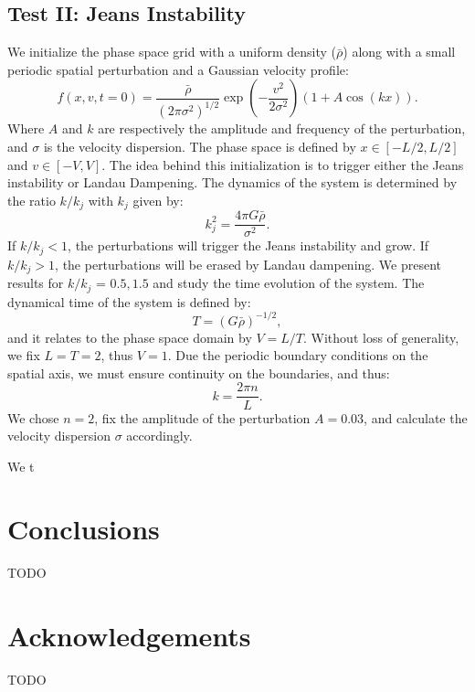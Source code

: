 \documentclass[fleqn,usenatbib]{mnras}
\begin{document}
\subsection{Test II: Jeans Instability}
We initialize the phase space grid with a uniform density ($\bar{\rho}$) along with a small periodic spatial perturbation and a Gaussian velocity profile:
\begin{equation}
f(x,v,t = 0) = \frac{\bar{\rho}}{(2\pi \sigma^2)^{1/2}} \exp(-\frac{v^2}{2 \sigma^2}) (1 + A\cos(kx)).
\end{equation} 
Where $A$ and $k$ are respectively the amplitude and frequency of the perturbation, and $\sigma$ is the velocity dispersion.
The phase space is defined by $x \in [-L/2,L/2]$ and $v \in [-V,V]$. The idea behind this initialization is to trigger either the Jeans instability or Landau Dampening. The dynamics of the system is determined by the ratio $k/k_j$ with $k_j$ given by:
\begin{equation}
\label{eq: k_j}
k_j^2 = \frac{4 \pi G \bar{\rho}}{\sigma^2}.
\end{equation}
If $k/k_j < 1$, the perturbations will trigger the Jeans instability and grow.
If $k/k_j>1$, the perturbations will be erased by Landau dampening.
We present results for $k/k_j$ = $0.5,1.5$ and study the time evolution of the system. The dynamical time of the system is defined by:
\begin{equation}
T = (G \bar{\rho})^{-1/2},
\end{equation}
and it relates to the phase space domain by $V = L / T$. Without loss of generality, we fix $L = T = 2$, thus $V = 1$.
Due the periodic boundary conditions on the spatial axis, we must ensure continuity on the boundaries, and thus:
\begin{equation}
k = \frac{2 \pi n}{L}.
\end{equation}
We chose $n=2$, fix the amplitude of the perturbation $A= 0.03$, and calculate the velocity dispersion $\sigma$ accordingly. 

We t
\section{Conclusions}

TODO

\section*{Acknowledgements}

TODO
\end{document}
